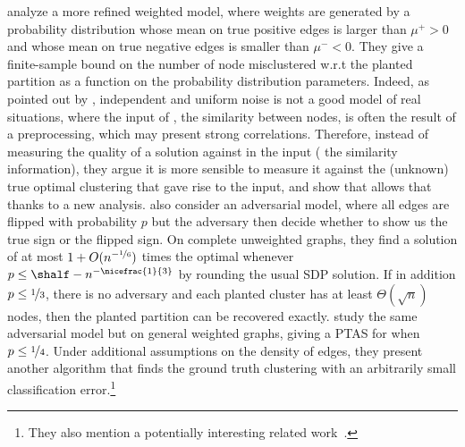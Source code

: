 \Textcite{Joachims2005} analyze a more refined weighted model, where weights are generated by a
probability distribution whose mean on true positive edges is larger than $\mu^+>0$ and whose mean
on true negative edges is smaller than $\mu^-<0$. They give a finite-sample bound on the number of
node misclustered w.r.t the planted partition as a function on the probability distribution
parameters. Indeed, as pointed out by \textcite{plantedAilon09}, independent and uniform noise is
not a good model of real situations, where the input of \pcc{}, \ie{} the similarity between nodes,
is often the result of a preprocessing, which may present strong correlations. Therefore, instead of
measuring the quality of a solution against in the input (\ie{} the similarity information), they
argue it is more sensible to measure it against the (unknown) true optimal clustering that gave rise
to the input, and show that \ccpivot{} allows that thanks to a new analysis. \Textcite{Mathieu2010}
also consider an adversarial model, where all edges are flipped with probability $p$ but the
adversary then decide whether to show us the true sign or the flipped sign. On complete unweighted
graphs, they find a solution of \mind{} at most $1 + O(n^{-\nicefrac{1}{6}})$ times the optimal
whenever $p \leq \shalf - n^{-\nicefrac{1}{3}}$ by rounding the usual SDP solution. If in addition
$p\leq\nicefrac{1}{3}$, there is no adversary and each planted cluster has at least
$\Theta(\sqrt{n})$ nodes, then the planted partition can be recovered exactly.
\Textcite{Makarychev2014} study the same adversarial model but on general weighted graphs, giving a PTAS
for \mind{} when $p\leq \nicefrac{1}{4}$. Under additional assumptions on the density of edges, they
present another algorithm that finds the ground truth clustering with an arbitrarily small
classification error.\footnote{They also mention a potentially interesting related
work~\autocite{unobservedCC14}.} %
